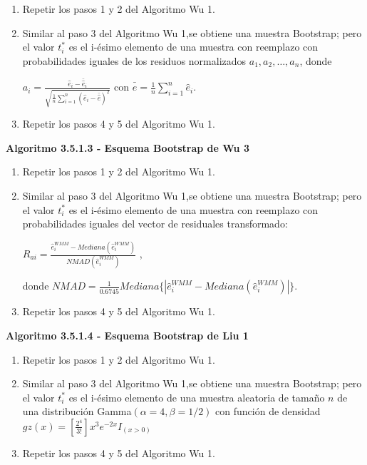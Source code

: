 \begin{enumerate}
	\item Repetir los pasos 1 y 2 del Algoritmo Wu 1.
	
	\item  Similar al paso 3 del Algoritmo Wu 1,se obtiene una muestra Bootstrap;
	pero el valor $t^{*}_{i}$ es el i-ésimo elemento de una muestra con reemplazo con probabilidades iguales de los residuos normalizados $a_{1},a_{2}, \dots,a_{n}$, donde
	
	\begin{center}
		$a_{i} = \frac{\hat{e}_{i}-\bar{\hat{ e}}_{i}}{ \sqrt{ \frac{1}{n} \sum_{i=1}^{n} (\hat{e}_{i}-\bar{\hat{e}})^{2} } }$ con $ \bar{\hat{e}}= \frac{1}{n} \sum_{i=1}^{n} \hat{e}_{i} $.
	\end{center}
	
	\item Repetir los pasos 4 y 5 del Algoritmo Wu 1.
\end{enumerate}



\textbf{Algoritmo 3.5.1.3 - Esquema Bootstrap de Wu 3}

\begin{enumerate}
	\item Repetir los pasos 1 y 2 del Algoritmo Wu 1.
	
	\item  Similar al paso 3 del Algoritmo Wu 1,se obtiene una muestra Bootstrap;
	pero el valor $t^{*}_{i}$ es el i-ésimo elemento de una muestra con reemplazo con probabilidades iguales del vector de residuales transformado:
	
	\begin{center}
		$R_{ai} = \frac{\hat{e}^{WMM}_{i} - Mediana(\hat{e}^{WMM}_{i})}{ NMAD(\hat{e}^{WMM}_{i})  }$ ,
	\end{center}
	donde $NMAD = \frac{1}{0.6745} Mediana\{ | \hat{e}^{WMM}_{i} - Mediana(\hat{e}^{WMM}_{i}) | \}$.
	
	\item Repetir los pasos 4 y 5 del Algoritmo Wu 1.
\end{enumerate}


\textbf{Algoritmo 3.5.1.4 - Esquema Bootstrap de Liu 1}

\begin{enumerate}
	\item Repetir los pasos 1 y 2 del Algoritmo Wu 1.
	
	\item  Similar al paso 3 del Algoritmo Wu 1,se obtiene una muestra Bootstrap;
	pero el valor $t^{*}_{i}$ es el i-ésimo elemento de una muestra aleatoria de tamaño $n$ de una distribución Gamma$(\alpha = 4,\beta = 1/2)$ con función de densidad $ gz(x) = [\frac{2^{4}}{3!}]x^{3}e^{-2x}I_{(x>0)}$ 

	
	\item Repetir los pasos 4 y 5 del Algoritmo Wu 1.
\end{enumerate}



